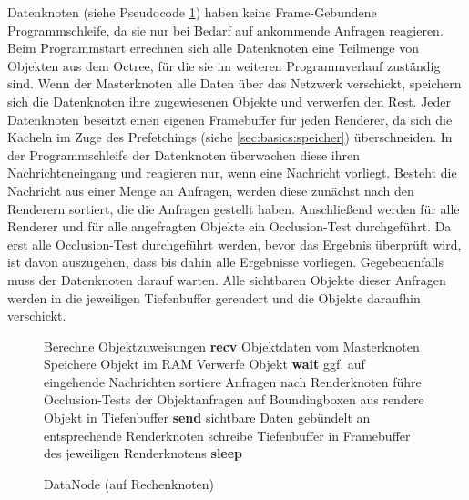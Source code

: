 Datenknoten (siehe Pseudocode \ref{alg:impl:datanode}) haben keine Frame-Gebundene Programmschleife, da sie nur bei Bedarf auf ankommende Anfragen reagieren. Beim Programmstart errechnen sich alle Datenknoten eine Teilmenge von Objekten aus dem Octree, für die sie im weiteren Programmverlauf zuständig sind. Wenn der Masterknoten alle Daten über das Netzwerk verschickt, speichern sich die Datenknoten ihre zugewiesenen Objekte und verwerfen den Rest. Jeder Datenknoten beseitzt einen eigenen Framebuffer für jeden Renderer, da sich die Kacheln im Zuge des Prefetchings (siehe \ref{sec:basics:speicher}) überschneiden. In der Programmschleife der Datenknoten überwachen diese ihren Nachrichteneingang und reagieren nur, wenn eine Nachricht vorliegt. Besteht die Nachricht aus einer Menge an Anfragen, werden diese zunächst nach den Renderern sortiert, die die Anfragen gestellt haben. Anschließend werden für alle Renderer und für alle angefragten Objekte ein Occlusion-Test durchgeführt. Da erst alle Occlusion-Test durchgeführt werden, bevor das Ergebnis überprüft wird, ist davon auszugehen, dass bis dahin alle Ergebnisse vorliegen. Gegebenenfalls muss der Datenknoten darauf warten. Alle sichtbaren Objekte dieser Anfragen werden in die jeweiligen Tiefenbuffer gerendert und die Objekte daraufhin verschickt.
\begin{figure}[ttt!]
\centering
 \begin{minipage}[t]{12cm}
\begin{algorithm}[H]
  \caption{DataNode (auf Rechenknoten)\label{alg:impl:datanode}} 
    \begin{algorithmic} [1]
      \STATE Berechne Objektzuweisungen
      \STATE \textbf{recv} Objektdaten vom Masterknoten
	\STATE Speichere Objekt im RAM
      \ELSE
	\STATE Verwerfe Objekt
      \ENDIF
	\STATE \textbf{wait} ggf. auf eingehende Nachrichten
	  \STATE sortiere Anfragen nach Renderknoten
	    \STATE führe Occlusion-Tests der Objektanfragen auf Boundingboxen aus
	  \ENDFOR
	    \STATE rendere Objekt in Tiefenbuffer
 	  \ENDFOR
	  \STATE \textbf{send} sichtbare Daten gebündelt an entsprechende Renderknoten
	  \STATE schreibe Tiefenbuffer in Framebuffer des jeweiligen Renderknotens
	\ELSE \STATE\textbf{sleep}
	\ENDIF
      \ENDWHILE
    \end{algorithmic}
\end{algorithm}
 \end{minipage}
\end{figure}

